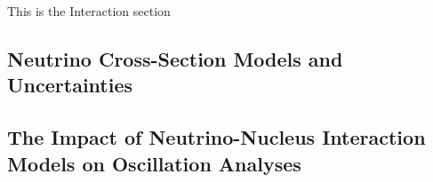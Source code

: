 This is the Interaction section
\subsection{Neutrino Cross-Section Models and Uncertainties}
\subsection{The Impact of Neutrino-Nucleus Interaction Models on Oscillation Analyses}